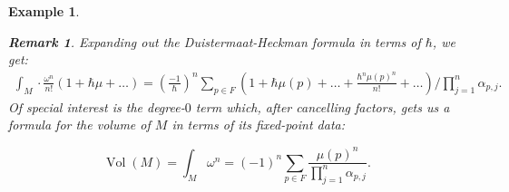 \documentclass{article}
\newtheorem{remark}{\it Remark\/}
\newtheorem{example}{Example}
\newcommand{\w}{\omega}
\DeclareMathOperator{\Vol}{Vol}
\begin{document}
\begin{example}
\begin{remark}
	Expanding out the Duistermaat-Heckman formula in terms of $\hbar$, we get:
	\begin{equation*}
		\begin{split}
			\int_{M} \cdot \frac{\w^{n}}{n!}\left( 1 + \hbar \mu + \ldots \right) = \left(\frac{-1}{\hbar}\right)^{n} \sum\limits_{p\in F} \left( 1 + \hbar\mu(p) + \ldots + \frac{\hbar^{n}\mu(p)^{n}}{n!} + \ldots \right) / \prod_{j = 1}^{n} \alpha_{p,j}.
		\end{split}
	\end{equation*}
	Of special interest is the degree-$0$ term which, after cancelling factors, gets us a formula for the volume of $M$ in terms of its fixed-point data:
	
	\begin{equation*}
		\Vol(M) = \int_{M} \w^{n} = (-1)^{n} \sum\limits_{p\in F} \frac{\mu(p)^{n}}{\prod_{j = 1}^{n}\alpha_{p,j}}.
	\end{equation*}
\end{remark}




\end{example}









  


\end{document}

